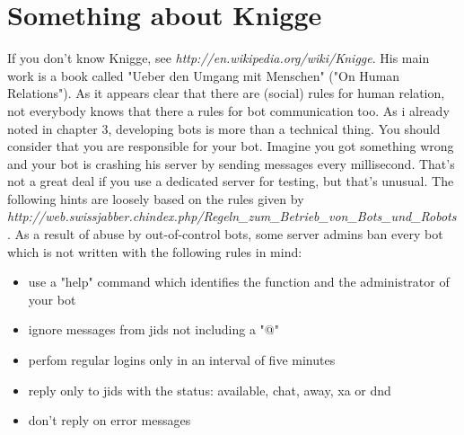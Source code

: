\chapter{Something about Knigge}

If you don't know Knigge, see \textit{http://en.wikipedia.org/wiki/Knigge}.
\newline
His main work is a book called "Ueber den Umgang mit Menschen" ("On Human Relations").
\newline
As it appears clear that there are (social) rules for human relation, not everybody knows that there a rules
for bot communication too.
\newline
\newline
As i already noted in chapter 3, developing bots is more than a technical thing.
You should consider that you are responsible for your bot. Imagine you got something wrong and your bot is crashing his server by sending messages every millisecond. That's not a great deal if you use a dedicated server for testing, but that's unusual.
\newline
\newline
The following hints are loosely based on the rules given by
\newline
\textit{http://web.swissjabber.ch\/index.php/Regeln\_zum\_Betrieb\_von\_Bots\_und\_Robots}.
As a result of abuse by out-of-control bots, some server admins ban every bot which is not written with the following rules in mind:
\begin{itemize}
\item use a "help" command which identifies the function and the administrator of your bot
\item ignore messages from jids not including a "@"
\item perfom regular logins only in an interval of five minutes
\item reply only to jids with the status: available, chat, away, xa or dnd
\item don't reply on error messages
\end{itemize}


